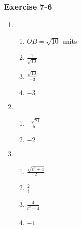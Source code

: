 {\begin{multicols}{3}
\subsubsection*{Exercise 7-6} %
  \begin{enumerate}[noitemsep, label=\textbf{\arabic*}. ]
   \item %
\begin{enumerate}[itemsep=1pt, label=\textbf{(\alph*)} ]
\item $OB=\sqrt{10}$ units%
\item $\frac{1}{\sqrt{10}}$%
\item $\frac{\sqrt{10}}{-3}$%
\item $-3$%
\end{enumerate}


\item %

\begin{enumerate}[itemsep=1pt, label=\textbf{(\alph*)} ]
\item $\frac{-\sqrt{21}}{5}$%
\item $-2$%
\end{enumerate}

\item %
\begin{enumerate}[noitemsep, label=\textbf{(\alph*)} ]
\item $\frac{\sqrt{t^2+4}}{2}$%
\item $\frac{2}{t}$%
\item $\frac{4}{t^2+4}$%
\item $-1$%
\end{enumerate}


\end{enumerate}
\end{multicols}}

